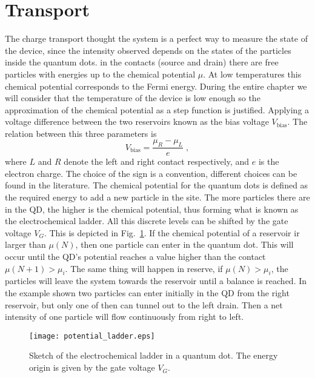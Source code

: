 \section{Transport}
The charge transport thought the system is a perfect way to measure the state of the device, since the intensity observed depends on the states of the particles inside the quantum dots. in the contacts (source and drain) there are free particles with energies up to the chemical potential $\mu$. At low temperatures this chemical potential corresponds to the Fermi energy. During the entire chapter we will consider that the temperature of the device is low enough so the approximation of the chemical potential as a step function is justified. Applying a voltage difference between the two reservoirs known as the bias voltage $V_{\text{bias}}$. The relation between this three parameters is
\begin{equation}
	V_{\text{bias}}=\frac{\mu_R-\mu_L}{e}\; ,
	\label{eq:deff_bias}
\end{equation}
where $L$ and $R$ denote the left and right contact respectively, and $e$ is the electron charge. The choice of the sign is a convention, different choices can be found in the literature. The chemical potential for the quantum dots is defined as the required energy to add a new particle in the site. The more particles there are in the QD, the higher is the chemical potential, thus forming what is known as the electrochemical ladder. All this discrete levels can be shifted by the gate voltage $V_G$. This is depicted in Fig.~\ref{fig:potential_ladder}. If the chemical potential of a reservoir ir larger than $\mu(N)$, then one particle can enter in the quantum dot. This will occur until the QD's potential reaches a value higher than the contact $\mu(N+1)>\mu_i$. The same thing will happen in reserve, if $\mu(N)>\mu_i$, the particles will leave the system towards the reservoir until a balance is reached. In the example shown two particles can enter initially in the QD from the right reservoir, but only one of then can tunnel out to the left drain. Then a net intensity of one particle will flow continuously from right to left.
\begin{figure}[!htb]
	\centering
	\texttt{[image: potential\_ladder.eps]}
	\caption{Sketch of the electrochemical ladder in a quantum dot. The energy origin is given by the gate voltage $V_G$.}
	\label{fig:potential_ladder}
\end{figure}

